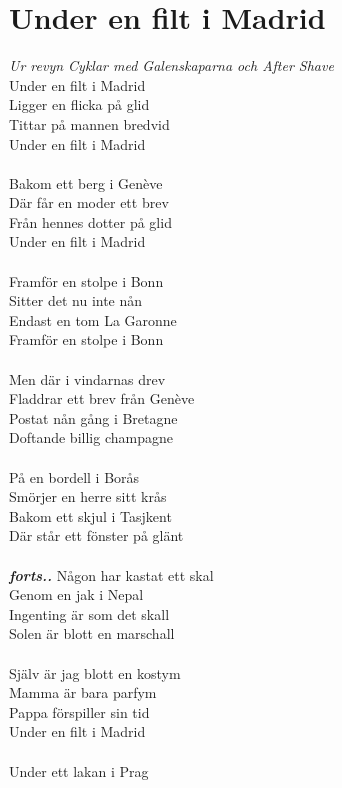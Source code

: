 \section{Under en filt i Madrid}
\textit{Ur revyn Cyklar med Galenskaparna och After Shave}
\vspace{2mm}\\
Under en filt i Madrid\\
Ligger en flicka på glid\\
Tittar på mannen bredvid\\
Under en filt i Madrid\\
\\
Bakom ett berg i Genève\\
Där får en moder ett brev\\
Från hennes dotter på glid\\
Under en filt i Madrid\\
\\
Framför en stolpe i Bonn\\
Sitter det nu inte nån\\
Endast en tom La Garonne\\
Framför en stolpe i Bonn\\
\\
Men där i vindarnas drev\\
Fladdrar ett brev från Genève\\
Postat nån gång i Bretagne\\
Doftande billig champagne\\
\\
På en bordell i Borås\\
Smörjer en herre sitt krås\\
Bakom ett skjul i Tasjkent\\
Där står ett fönster på glänt\\
\\
\textbf{\textit{forts..}}
\newpage
\noindent Någon har kastat ett skal\\
Genom en jak i Nepal\\
Ingenting är som det skall\\
Solen är blott en marschall\\
\\
Själv är jag blott en kostym\\
Mamma är bara parfym\\
Pappa förspiller sin tid\\
Under en filt i Madrid\\
\\
Under ett lakan i Prag\\
